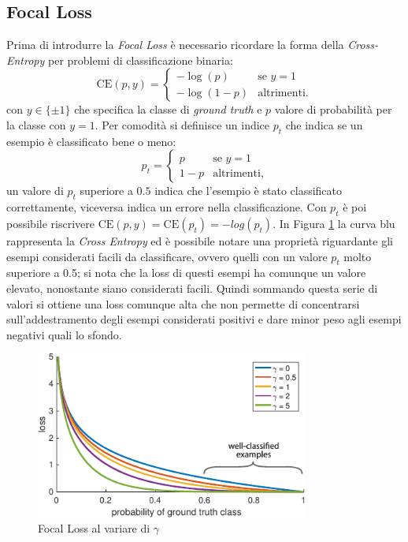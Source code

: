\subsection{Focal Loss}
\label{subsec:focal_loss}
Prima di introdurre la \textit{Focal Loss} è necessario ricordare la forma della \textit{Cross-Entropy} per problemi di classificazione binaria:
$$\textrm{CE}(p,y) = \begin{cases} -\log(p) &\text{se $y = 1$}\\
-\log (1 - p) &\text{altrimenti.}\end{cases}$$ con $y \in \{\pm 1 \}$ che specifica la classe di \textit{ground truth} e $p$ valore di probabilità per la classe con $y=1$.
Per comodità si definisce un indice $p_t$ che indica se un esempio è classificato bene o meno:
$$p_t = \begin{cases} p &\text{se $y = 1$}\\ 1 - p &\text{altrimenti,}\end{cases}$$
un valore di $p_t$ superiore a $0.5$ indica che l'esempio è stato classificato correttamente, viceversa indica un errore nella classificazione. Con $p_t$ è poi possibile riscrivere $\textrm{CE}(p, y) = \textrm{CE}(p_t) = -log(p_t)$. In Figura \ref{fig:focal_loss} la curva blu rappresenta la \textit{Cross Entropy} ed è possibile notare una proprietà riguardante gli esempi considerati facili da classificare, ovvero quelli con un valore $p_t$ molto superiore a 0.5; si nota che la loss di questi esempi ha comunque un valore elevato, nonostante siano considerati facili. Quindi sommando questa serie di valori si ottiene una loss comunque alta che non permette di concentrarsi sull'addestramento degli esempi considerati positivi e dare minor peso agli esempi negativi quali lo sfondo. 
\begin{figure}
    \centering
    \includegraphics[width=0.8\textwidth]{images/loss.pdf}
    \caption{Focal Loss al variare di $\gamma$}
    \label{fig:focal_loss}
\end{figure}
